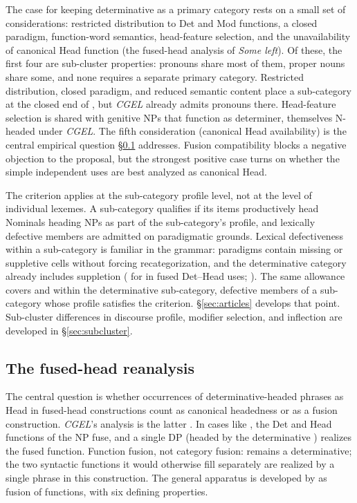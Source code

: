\documentclass[12pt]{article}
\begin{document}
The case for keeping determinative as a primary category rests on a small set of considerations: restricted distribution to Det and Mod functions, a closed paradigm, function-word semantics, head-feature selection, and the unavailability of canonical Head function (the fused-head analysis of \textit{Some left}). Of these, the first four are sub-cluster properties: pronouns share most of them, proper nouns share some, and none requires a separate primary category. Restricted distribution, closed paradigm, and reduced semantic content place a sub-category at the closed end of , but \textit{CGEL} already admits pronouns there. Head-feature selection is shared with genitive NPs that function as determiner, themselves N-headed under \textit{CGEL}. The fifth consideration (canonical Head availability) is the central empirical question §\ref{subsec:fused-head} addresses. Fusion compatibility blocks a negative objection to the proposal, but the strongest positive case turns on whether the simple independent uses are best analyzed as canonical Head.

The criterion applies at the sub-category profile level, not at the level of individual lexemes. A sub-category qualifies if its items productively head Nominals heading NPs as part of the sub-category's profile, and lexically defective members are admitted on paradigmatic grounds. Lexical defectiveness within a sub-category is familiar in the grammar: paradigms contain missing or suppletive cells without forcing recategorization, and the determinative category already includes suppletion ( for  in fused Det--Head uses; \textcite[22--23]{Payne2007}). The same allowance covers  and  within the determinative sub-category, defective members of a sub-category whose profile satisfies the criterion. §\ref{sec:articles} develops that point. Sub-cluster differences in discourse profile, modifier selection, and inflection are developed in §\ref{sec:subcluster}.

\subsection{The fused-head reanalysis}\label{subsec:fused-head}

The central question is whether occurrences of determinative-headed phrases as Head in fused-head constructions count as canonical headedness or as a fusion construction. \textit{CGEL}'s analysis is the latter \citep[Ch.~5 §9]{huddleston2002}. In cases like , the Det and Head functions of the NP fuse, and a single DP (headed by the determinative ) realizes the fused function. Function fusion, not category fusion:  remains a determinative; the two syntactic functions it would otherwise fill separately are realized by a single phrase in this construction. The general apparatus is developed by \textcite{Payne2007} as fusion of functions, with six defining properties.
\end{document}
